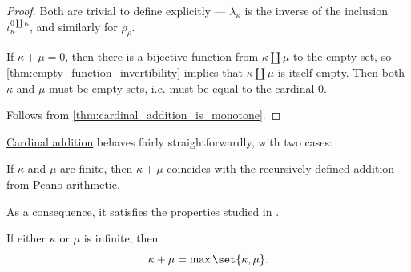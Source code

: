 \begin{proof}
  Both are trivial to define explicitly --- \( \lambda_\kappa \) is the inverse of the inclusion \( \iota_\kappa^{0 \amalg \kappa} \), and similarly for \( \rho_\rho \).

   If \( \kappa + \mu = 0 \), then there is a bijective function from \( \kappa \amalg \mu \) to the empty set, so \cref{thm:empty_function_invertibility} implies that \( \kappa \amalg \mu \) is itself empty. Then both \( \kappa \) and \( \mu \) must be empty sets, i.e. must be equal to the cardinal \( 0 \).

   Follows from \cref{thm:cardinal_addition_is_monotone}.
\end{proof}

\begin{proposition}\label{thm:simplified_cardinal_addition}
  \hyperref[def:cardinal_addition]{Cardinal addition} behaves fairly straightforwardly, with two cases:
  \begin{thmenum}
     If \( \kappa \) and \( \mu \) are \hyperref[def:aleph_zero_related_cardinalities]{finite}, then \( \kappa + \mu \) coincides with the recursively defined addition from \hyperref[def:peano_arithmetic]{Peano arithmetic}.

    As a consequence, it satisfies the properties studied in .

     If either \( \kappa \) or \( \mu \) is infinite, then
    \begin{equation*}
      \kappa + \mu = \max\set{ \kappa, \mu }.
    \end{equation*}
  \end{thmenum}
\end{proposition}
